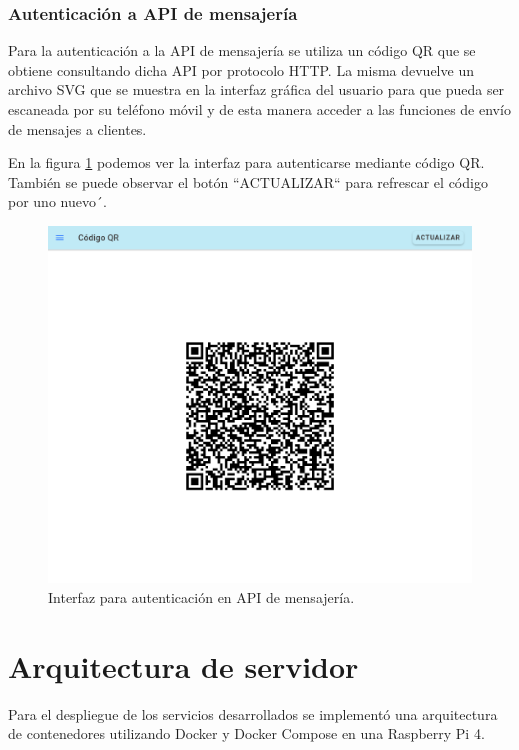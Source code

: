 \subsubsection{Autenticación a API de mensajería}
\label{subsubsec:frontqr}

Para la autenticación a la API de mensajería se utiliza un código QR que se obtiene consultando dicha API por protocolo HTTP. La misma devuelve un archivo SVG que se muestra en la interfaz gráfica del usuario para que pueda ser escaneada por su teléfono móvil y de esta manera acceder a las funciones de envío de mensajes a clientes.

En la figura \ref{fig:frontqr} podemos ver la interfaz para autenticarse mediante código QR. También se puede observar el botón ``ACTUALIZAR`` para refrescar el código por uno nuevo´.

\begin{figure}[H]
	\centering
	\includegraphics[scale=.30]{./Figures/qr-page.png}
	\caption{Interfaz para autenticación en API de mensajería.}
	\label{fig:frontqr}
\end{figure}

\section{Arquitectura de servidor}
\label{sec:server}

Para el despliegue de los servicios desarrollados se implementó una arquitectura de contenedores utilizando Docker y Docker Compose en una Raspberry Pi 4.

